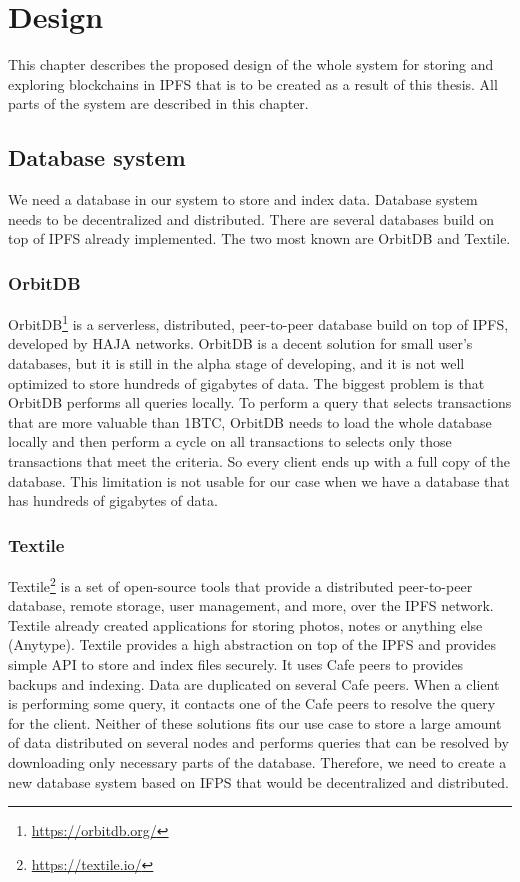 \chapter{Design}
\label{Design}
This chapter describes the proposed design of the whole system for storing and exploring blockchains in IPFS that is to be created as a result of this thesis. All parts of the system are described in this chapter.

\section{Database system}
We need a database in our system to store and index data. Database system needs to be decentralized and distributed. There are several databases build on top of IPFS already implemented. The two most known are OrbitDB and Textile.

\subsection{OrbitDB}
OrbitDB\footnote{\url{https://orbitdb.org/}} is a serverless, distributed, peer-to-peer database build on top of IPFS, developed by HAJA networks. OrbitDB is a decent solution for small user's databases, but it is still in the alpha stage of developing, and it is not well optimized to store hundreds of gigabytes of data. The biggest problem is that OrbitDB performs all queries locally. To perform a query that selects transactions that are more valuable than 1BTC, OrbitDB needs to load the whole database locally and then perform a cycle on all transactions to selects only those transactions that meet the criteria. So every client ends up with a full copy of the database. This limitation is not usable for our case when we have a database that has hundreds of gigabytes of data.\cite{OrbitDBManual}

\subsection{Textile}
Textile\footnote{\url{https://textile.io/}} is a set of open-source tools that provide a distributed peer-to-peer database, remote storage, user management, and more, over the IPFS network. Textile already created applications for storing photos, notes or anything else (Anytype). Textile provides a high abstraction on top of the IPFS and provides simple API to store and index files securely. It uses Cafe peers to provides backups and indexing. Data are duplicated on several Cafe peers. When a client is performing some query, it contacts one of the Cafe peers to resolve the query for the client.
Neither of these solutions fits our use case to store a large amount of data distributed on several nodes and performs queries that can be resolved by downloading only necessary parts of the database. Therefore, we need to create a new database system based on IFPS that would be decentralized and distributed.\cite{TextileWhitePaper}

